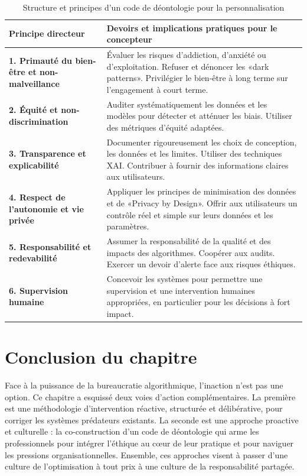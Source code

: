 \begin{table}[ht]
\centering
\renewcommand{\tablename}{Tableau} 
\caption{Structure et principes d'un code de déontologie pour la personnalisation}
\label{tab:code_deonto}
\begin{tabular}{@{}p{}p{}@{}}
\toprule
\textbf{Principe directeur} & \textbf{Devoirs et implications pratiques pour le concepteur} \\ \midrule
\textbf{1. Primauté du bien-être et non-malveillance} & Évaluer les risques d'addiction, d'anxiété ou d'exploitation. Refuser et dénoncer les «dark patterns». Privilégier le bien-être à long terme sur l'engagement à court terme. \\
\textbf{2. Équité et non-discrimination} & Auditer systématiquement les données et les modèles pour détecter et atténuer les biais. Utiliser des métriques d'équité adaptées. \\
\textbf{3. Transparence et explicabilité} & Documenter rigoureusement les choix de conception, les données et les limites. Utiliser des techniques XAI. Contribuer à fournir des informations claires aux utilisateurs. \\
\textbf{4. Respect de l'autonomie et vie privée} & Appliquer les principes de minimisation des données et de «Privacy by Design». Offrir aux utilisateurs un contrôle réel et simple sur leurs données et les paramètres. \\
\textbf{5. Responsabilité et redevabilité} & Assumer la responsabilité de la qualité et des impacts des algorithmes. Coopérer aux audits. Exercer un devoir d'alerte face aux risques éthiques. \\
\textbf{6. Supervision humaine} & Concevoir les systèmes pour permettre une supervision et une intervention humaines appropriées, en particulier pour les décisions à fort impact. \\ \bottomrule
\end{tabular}
\end{table}

\section{Conclusion du chapitre}
Face à la puissance de la bureaucratie algorithmique, l'inaction n'est pas une option. Ce chapitre a esquissé deux voies d'action complémentaires. La première est une méthodologie d'intervention réactive, structurée et délibérative, pour corriger les systèmes prédateurs existants. La seconde est une approche proactive et culturelle : la co-construction d'un code de déontologie qui arme les professionnels pour intégrer l'éthique au cœur de leur pratique et pour naviguer les pressions organisationnelles. Ensemble, ces approches visent à passer d'une culture de l'optimisation à tout prix à une culture de la responsabilité partagée.
